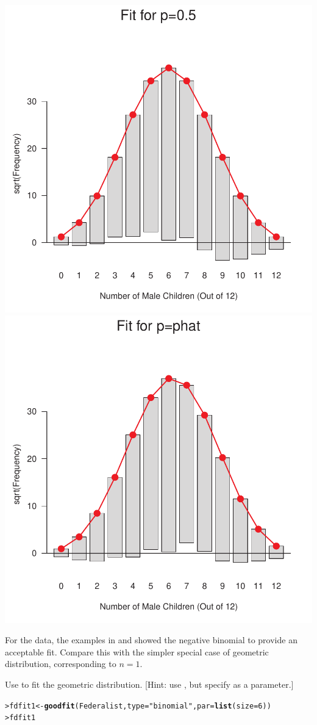 \documentclass[10pt]{report}\usepackage[]{graphicx}\usepackage[]{color}
\makeatletter
\newcommand{\hlnum}[1]{\textcolor[rgb]{0.686,0.059,0.569}{#1}}%
\newcommand{\hlstr}[1]{\textcolor[rgb]{0.192,0.494,0.8}{#1}}%
\newcommand{\hlstd}[1]{\textcolor[rgb]{0.345,0.345,0.345}{#1}}%
\newcommand{\hlkwb}[1]{\textcolor[rgb]{0.69,0.353,0.396}{#1}}%
\newcommand{\hlkwc}[1]{\textcolor[rgb]{0.333,0.667,0.333}{#1}}%
\newcommand{\hlkwd}[1]{\textcolor[rgb]{0.737,0.353,0.396}{\textbf{#1}}}%
\newenvironment{kframe}{%
 \def\at@end@of@kframe{}%
 \ifinner\ifhmode%
  \def\at@end@of@kframe{\end{minipage}}%
  \begin{minipage}{\columnwidth}%
 \fi\fi%
 \def\FrameCommand##1{\hskip\@totalleftmargin \hskip-\fboxsep
 \colorbox{shadecolor}{##1}\hskip-\fboxsep
     \hskip-\linewidth \hskip-\@totalleftmargin \hskip\columnwidth}%
 \MakeFramed {\advance\hsize-\width
   \@totalleftmargin\z@ \linewidth\hsize
   \@setminipage}}%
 {\par\unskip\endMakeFramed%
 \at@end@of@kframe}
\newenvironment{knitrout}{}{} %
\renewenvironment{knitrout}{\small\renewcommand{\baselinestretch}{.85}}{} %
\makeatother
\begin{document}
\begin{Exercises}
\begin{enumerate*}
\begin{ans}
\begin{knitrout}
\centerline{\includegraphics[width=.49\textwidth]{soln/fig/ex3_4c-1} 
\includegraphics[width=.49\textwidth]{soln/fig/ex3_4c-2} }



\end{knitrout}
    \end{ans}
    
  \end{enumerate*}

  \exercise For the  data, the examples in  and
   showed the negative binomial to provide an acceptable fit.
  Compare this with the simpler special case of geometric distribution, corresponding
  to $n=1$.
  \begin{enumerate*}
    \item Use  to fit the geometric distribution. 
    [Hint: use , but specify  as a parameter.]
    \begin{ans}
\begin{knitrout}\footnotesize
{}\color{fgcolor}\begin{kframe}
\begin{alltt}
\hlstd{> }\hlstd{fdfit1} \hlkwb{<-} \hlkwd{goodfit}\hlstd{(Federalist,} \hlkwc{type} \hlstd{=} \hlstr{"binomial"}\hlstd{,} \hlkwc{par} \hlstd{=} \hlkwd{list}\hlstd{(}\hlkwc{size}\hlstd{=}\hlnum{6}\hlstd{))}
\hlstd{> }\hlstd{fdfit1}
\end{alltt}
\begin{verbatim}


\end{verbatim}
\end{kframe}
\end{knitrout}
\end{ans}
\end{enumerate*}
\end{Exercises}
\end{document}
